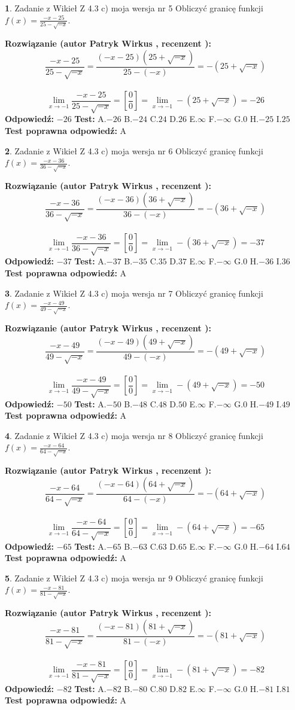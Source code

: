 \documentclass[12pt, a4paper]{article}
\theoremstyle{definition} %
\newtheorem{zad}{}
\newcommand{\zadStart}[1]{\begin{zad}#1\newline}
\newcommand{\zadStop}{\end{zad}}
\newcommand{\rozwStart}[2]{\noindent \textbf{Rozwiązanie (autor #1 , recenzent #2): }\newline}
\newcommand{\rozwStop}{\newline}
\newcommand{\odpStart}{\noindent \textbf{Odpowiedź:}\newline}
\newcommand{\odpStop}{\newline}
\newcommand{\testStart}{\noindent \textbf{Test:}\newline}
\newcommand{\testStop}{\newline}
\newcommand{\kluczStart}{\noindent \textbf{Test poprawna odpowiedź:}\newline}
\newcommand{\kluczStop}{\newline}
\begin{document}
\zadStart{Zadanie z Wikieł Z 4.3 c) moja wersja nr 5}
Obliczyć granicę funkcji $f(x)=\frac{-x-25}{25-\sqrt{-x}}$.
\zadStop
\rozwStart{Patryk Wirkus}{}
$$\frac{-x-25}{25-\sqrt{-x}}=\frac{(-x-25)(25+\sqrt{-x})}{25-(-x)}=-(25+\sqrt{-x})$$
\\
$$\lim\limits_{x\to-1}\frac{-x-25}{25-\sqrt{-x}}=[\frac{0}{0}]=\lim\limits_{x\to-1}-(25+\sqrt{-x}) =-26$$
\rozwStop
\odpStart
$-26$
\odpStop
\testStart
A.$-26$
B.$-24$
C.$24$
D.$26$
E.$\infty$
F.$-\infty$
G.$0$
H.$-25$
I.$25$
\testStop
\kluczStart
A
\kluczStop



\zadStart{Zadanie z Wikieł Z 4.3 c) moja wersja nr 6}
Obliczyć granicę funkcji $f(x)=\frac{-x-36}{36-\sqrt{-x}}$.
\zadStop
\rozwStart{Patryk Wirkus}{}
$$\frac{-x-36}{36-\sqrt{-x}}=\frac{(-x-36)(36+\sqrt{-x})}{36-(-x)}=-(36+\sqrt{-x})$$
\\
$$\lim\limits_{x\to-1}\frac{-x-36}{36-\sqrt{-x}}=[\frac{0}{0}]=\lim\limits_{x\to-1}-(36+\sqrt{-x}) =-37$$
\rozwStop
\odpStart
$-37$
\odpStop
\testStart
A.$-37$
B.$-35$
C.$35$
D.$37$
E.$\infty$
F.$-\infty$
G.$0$
H.$-36$
I.$36$
\testStop
\kluczStart
A
\kluczStop



\zadStart{Zadanie z Wikieł Z 4.3 c) moja wersja nr 7}
Obliczyć granicę funkcji $f(x)=\frac{-x-49}{49-\sqrt{-x}}$.
\zadStop
\rozwStart{Patryk Wirkus}{}
$$\frac{-x-49}{49-\sqrt{-x}}=\frac{(-x-49)(49+\sqrt{-x})}{49-(-x)}=-(49+\sqrt{-x})$$
\\
$$\lim\limits_{x\to-1}\frac{-x-49}{49-\sqrt{-x}}=[\frac{0}{0}]=\lim\limits_{x\to-1}-(49+\sqrt{-x}) =-50$$
\rozwStop
\odpStart
$-50$
\odpStop
\testStart
A.$-50$
B.$-48$
C.$48$
D.$50$
E.$\infty$
F.$-\infty$
G.$0$
H.$-49$
I.$49$
\testStop
\kluczStart
A
\kluczStop



\zadStart{Zadanie z Wikieł Z 4.3 c) moja wersja nr 8}
Obliczyć granicę funkcji $f(x)=\frac{-x-64}{64-\sqrt{-x}}$.
\zadStop
\rozwStart{Patryk Wirkus}{}
$$\frac{-x-64}{64-\sqrt{-x}}=\frac{(-x-64)(64+\sqrt{-x})}{64-(-x)}=-(64+\sqrt{-x})$$
\\
$$\lim\limits_{x\to-1}\frac{-x-64}{64-\sqrt{-x}}=[\frac{0}{0}]=\lim\limits_{x\to-1}-(64+\sqrt{-x}) =-65$$
\rozwStop
\odpStart
$-65$
\odpStop
\testStart
A.$-65$
B.$-63$
C.$63$
D.$65$
E.$\infty$
F.$-\infty$
G.$0$
H.$-64$
I.$64$
\testStop
\kluczStart
A
\kluczStop



\zadStart{Zadanie z Wikieł Z 4.3 c) moja wersja nr 9}
Obliczyć granicę funkcji $f(x)=\frac{-x-81}{81-\sqrt{-x}}$.
\zadStop
\rozwStart{Patryk Wirkus}{}
$$\frac{-x-81}{81-\sqrt{-x}}=\frac{(-x-81)(81+\sqrt{-x})}{81-(-x)}=-(81+\sqrt{-x})$$
\\
$$\lim\limits_{x\to-1}\frac{-x-81}{81-\sqrt{-x}}=[\frac{0}{0}]=\lim\limits_{x\to-1}-(81+\sqrt{-x}) =-82$$
\rozwStop
\odpStart
$-82$
\odpStop
\testStart
A.$-82$
B.$-80$
C.$80$
D.$82$
E.$\infty$
F.$-\infty$
G.$0$
H.$-81$
I.$81$
\testStop
\kluczStart
A
\kluczStop
\end{document}
